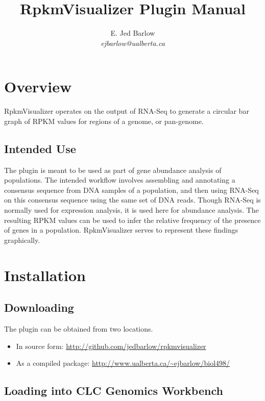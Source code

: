 \documentclass[12pt,letterpaper]{article}
\author{
    E. Jed Barlow\\
    \textit{ejbarlow@ualberta.ca}
}
\title{RpkmVisualizer Plugin Manual}
\begin{document}
\maketitle

\hfill

\tableofcontents

\newpage
\section{Overview}


RpkmVisualizer operates on the output of RNA-Seq to generate a circular bar
graph of RPKM values for regions of a genome, or pan-genome.

\subsection{Intended Use}

The plugin is meant to be used as part of gene abundance analysis of
populations.  The intended workflow involves assembling and annotating a
consensus sequence from DNA samples of a population, and then using RNA-Seq on
this consensus sequence using the same set of DNA reads.  Though RNA-Seq is
normally used for expression analysis, it is used here for abundance analysis.
The resulting RPKM values can be used to infer the relative frequency of the
presence of genes in a population.  RpkmVisualizer serves to represent these
findings graphically.

\section{Installation}

\subsection{Downloading}

The plugin can be obtained from two locations.

\begin{itemize}
\item
    In source form: \url{http://github.com/jedbarlow/rpkmvisualizer}
\item
    As a compiled package: \url{http://www.ualberta.ca/~ejbarlow/biol498/}
\end{itemize}

\subsection{Loading into CLC Genomics Workbench}
\end{document}
